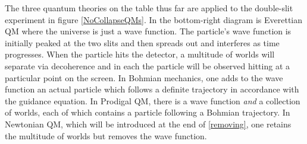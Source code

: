 \documentclass[onecolumn,secnumarabic,balancelastpage,amsmath,amssymb,nofootinbib]{article}
\begin{document}
The three quantum theories on the table thus far are applied to the double-slit experiment in figure \ref{NoCollapseQMs}.  In the bottom-right diagram is Everettian QM where the universe is just a wave function.  The particle's wave function is initially peaked at the two slits and then spreads out and interferes as time progresses.  When the particle hits the detector, a multitude of worlds will separate via decoherence and in each the particle will be observed hitting at a particular point on the screen.  In Bohmian mechanics, one adds to the wave function an actual particle which follows a definite trajectory in accordance with the guidance equation.  In Prodigal QM, there is a wave function \emph{and} a collection of worlds, each of which contains a particle following a Bohmian trajectory.  In Newtonian QM, which will be introduced at the end of \textsection \ref{removing}, one retains the multitude of worlds but removes the wave function.
\end{document}
